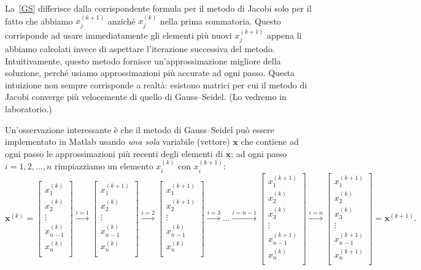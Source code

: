 \documentclass[a4paper]{report}
\theoremstyle{definiton}
\theoremstyle{remark}
\newcommand{\x}{\mathbf{x}}
\begin{document}
La~\eqref{GS} differisce dalla corrispondente formula per il metodo di Jacobi solo per il fatto che abbiamo $x_j^{(k+1)}$ anziché $x_j^{(k)}$ nella prima sommatoria. Questo corrisponde ad usare immediatamente gli elementi più nuovi $x_j^{(k+1)}$ appena li abbiamo calcolati invece di aspettare l'iterazione successiva del metodo. Intuitivamente, questo metodo fornisce un'approssimazione migliore della soluzione, perché usiamo approssimazioni più accurate ad ogni passo. Questa intuizione non sempre corrisponde a realtà: esistono matrici per cui il metodo di Jacobi converge più velocemente di quello di Gauss--Seidel. (Lo vedremo in laboratorio.)

Un'osservazione interessante è che il metodo di Gauss--Seidel può essere implementato in Matlab usando \emph{una sola} variabile (vettore) $\x$ che contiene ad ogni passo le approssimazioni più recenti degli elementi di $\x$; ad ogni passo $i=1,2,\dots,n$ rimpiazziamo un elemento $x_i^{(k)}$ con $x_i^{(k+1)}$:
\[
\x^{(k)} = \begin{bmatrix}
    x^{(k)}_1\\ 
    x^{(k)}_2\\ 
    \vdots \\
    x^{(k)}_{n-1}\\ 
    x^{(k)}_n\\ 
\end{bmatrix} \stackrel{i=1}{\to}
\begin{bmatrix}
    x^{(k+1)}_1\\ 
    x^{(k)}_2\\ 
    \vdots \\
    x^{(k)}_{n-1}\\ 
    x^{(k)}_n\\ 
\end{bmatrix} \stackrel{i=2}{\to}
\begin{bmatrix}
    x^{(k+1)}_1\\ 
    x^{(k+1)}_2\\ 
    \vdots \\
    x^{(k)}_{n-1}\\ 
    x^{(k)}_n\\ 
\end{bmatrix} \stackrel{i=3}{\to}
\dots
\stackrel{i=n-1}{\to}
\begin{bmatrix}
    x^{(k+1)}_1\\ 
    x^{(k)}_2\\ 
    x^{(k)}_3\\ 
    \vdots \\
    x^{(k+1)}_{n-1}\\ 
    x^{(k)}_n\\ 
\end{bmatrix} \stackrel{i=n}{\to}
\begin{bmatrix}
    x^{(k+1)}_1\\ 
    x^{(k)}_2\\ 
    x^{(k)}_3\\ 
    \vdots \\
    x^{(k+1)}_{n-1}\\ 
    x^{(k+1)}_n\\ 
\end{bmatrix} = \x^{(k+1)}.
\]
\end{document}
